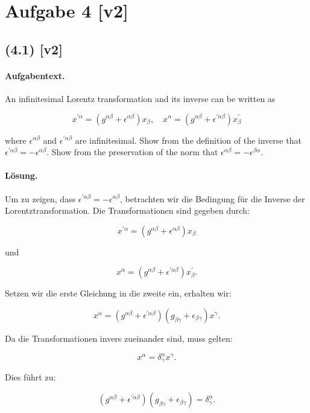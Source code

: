 \documentclass[11pt,a4paper]{article}
\begin{document}
\section*{Aufgabe 4 [v2]}
\subsection*{(4.1) [v2]}
\paragraph{Aufgabentext.}
An infinitesimal Lorentz transformation and its inverse can be written as

$$
x^{\prime \alpha}=\left(g^{\alpha \beta}+\epsilon^{\alpha \beta}\right) x_\beta, \quad x^\alpha=\left(g^{\alpha \beta}+\epsilon^{\prime \alpha \beta}\right) x_\beta^{\prime}
$$

where $\epsilon^{\alpha \beta}$ and $\epsilon^{\prime \alpha \beta}$ are infinitesimal. Show from the definition of the inverse that $\epsilon^{\prime \alpha \beta}=- \epsilon^{\alpha \beta}$. Show from the preservation of the norm that $\epsilon^{\alpha \beta}=-\epsilon^{\beta \alpha}$.

\paragraph{Lösung.}
Um zu zeigen, dass $\epsilon^{\prime \alpha \beta} = - \epsilon^{\alpha \beta}$, betrachten wir die Bedingung für die Inverse der Lorentztransformation. Die Transformationen sind gegeben durch:

\[
x^{\prime \alpha} = \left(g^{\alpha \beta} + \epsilon^{\alpha \beta}\right) x_\beta
\]

und

\[
x^\alpha = \left(g^{\alpha \beta} + \epsilon^{\prime \alpha \beta}\right) x_\beta^{\prime}.
\]

Setzen wir die erste Gleichung in die zweite ein, erhalten wir:

\[
x^\alpha = \left(g^{\alpha \beta} + \epsilon^{\prime \alpha \beta}\right) \left(g_{\beta \gamma} + \epsilon_{\beta \gamma}\right) x^\gamma.
\]

Da die Transformationen invers zueinander sind, muss gelten:

\[
x^\alpha = \delta^\alpha_\gamma x^\gamma.
\]

Dies führt zu:

\[
\left(g^{\alpha \beta} + \epsilon^{\prime \alpha \beta}\right) \left(g_{\beta \gamma} + \epsilon_{\beta \gamma}\right) = \delta^\alpha_\gamma.
\]
\end{document}

